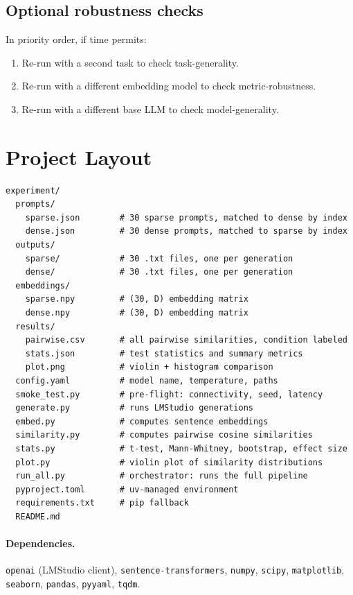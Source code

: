 \documentclass[11pt]{article}
\begin{document}
\subsection{Optional robustness checks}

In priority order, if time permits:
\begin{enumerate}[leftmargin=*,itemsep=2pt,topsep=4pt]
  \item Re-run with a second task to check task-generality.
  \item Re-run with a different embedding model to check metric-robustness.
  \item Re-run with a different base LLM to check model-generality.
\end{enumerate}

\section{Project Layout}

\begin{lstlisting}[style=yamlstyle,language={}]
experiment/
  prompts/
    sparse.json        # 30 sparse prompts, matched to dense by index
    dense.json         # 30 dense prompts, matched to sparse by index
  outputs/
    sparse/            # 30 .txt files, one per generation
    dense/             # 30 .txt files, one per generation
  embeddings/
    sparse.npy         # (30, D) embedding matrix
    dense.npy          # (30, D) embedding matrix
  results/
    pairwise.csv       # all pairwise similarities, condition labeled
    stats.json         # test statistics and summary metrics
    plot.png           # violin + histogram comparison
  config.yaml          # model name, temperature, paths
  smoke_test.py        # pre-flight: connectivity, seed, latency
  generate.py          # runs LMStudio generations
  embed.py             # computes sentence embeddings
  similarity.py        # computes pairwise cosine similarities
  stats.py             # t-test, Mann-Whitney, bootstrap, effect size
  plot.py              # violin plot of similarity distributions
  run_all.py           # orchestrator: runs the full pipeline
  pyproject.toml       # uv-managed environment
  requirements.txt     # pip fallback
  README.md
\end{lstlisting}

\paragraph{Dependencies.}
\texttt{openai} (LMStudio client), \texttt{sentence-transformers}, \texttt{numpy}, \texttt{scipy}, \texttt{matplotlib}, \texttt{seaborn}, \texttt{pandas}, \texttt{pyyaml}, \texttt{tqdm}.
\end{document}
